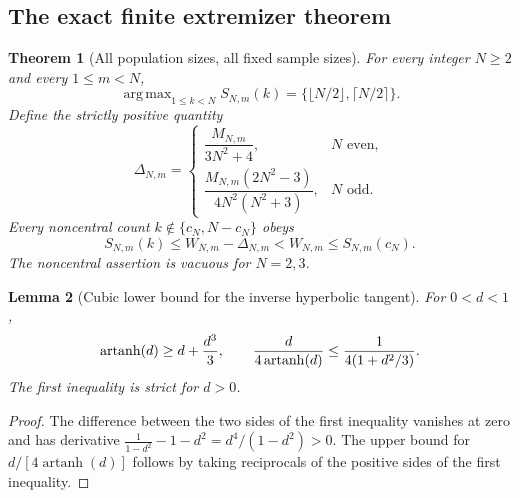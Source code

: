 \documentclass[11pt,a4paper]{article}
\newtheorem{theorem}{Theorem}[section]
\newtheorem{lemma}[theorem]{Lemma}
\DeclareMathOperator*{\argmax}{arg\,max}
\begin{document}
\subsection{The exact finite extremizer theorem}
\begin{theorem}[All population sizes, all fixed sample sizes]\label{B:main}
For every integer $N\ge2$ and every $1\le m<N$,
\begin{equation}\label{B:argmax}
\argmax_{1\le k<N}S_{N,m}(k)
=\{\lfloor N/2\rfloor,\lceil N/2\rceil\}.
\end{equation}
Define the strictly positive quantity
\begin{equation}\label{B:delta}
\Delta_{N,m}=
\begin{cases}
\dfrac{M_{N,m}}{3N^2+4},& N\text{ even},\\[6pt]
\dfrac{M_{N,m}(2N^2-3)}{4N^2(N^2+3)},& N\text{ odd}.
\end{cases}
\end{equation}
Every noncentral count $k\notin\{c_N,N-c_N\}$ obeys
\begin{equation}\label{B:strict}
S_{N,m}(k)\le W_{N,m}-\Delta_{N,m}
<W_{N,m}\le S_{N,m}(c_N).
\end{equation}
The noncentral assertion is vacuous for $N=2,3$.
\end{theorem}

\begin{lemma}[Cubic lower bound for the inverse hyperbolic tangent]\label{B:atanh}
For $0<d<1$,
\begin{equation}\label{B:Bdeficit}
\operatorname{artanh}(d)\ge d+\frac{d^3}{3},\qquad
\frac{d}{4\operatorname{artanh}(d)}
\le\frac{1}{4(1+d^2/3)}.
\end{equation}
The first inequality is strict for $d>0$.
\end{lemma}
\begin{proof}
The difference between the two sides of the first inequality vanishes at zero and has derivative
$\frac{1}{1-d^2}-1-d^2=d^4/(1-d^2)>0$.
The upper bound for $d/[4\operatorname{artanh}(d)]$ follows by taking reciprocals of the positive sides of the first inequality.
\end{proof}
\end{document}
